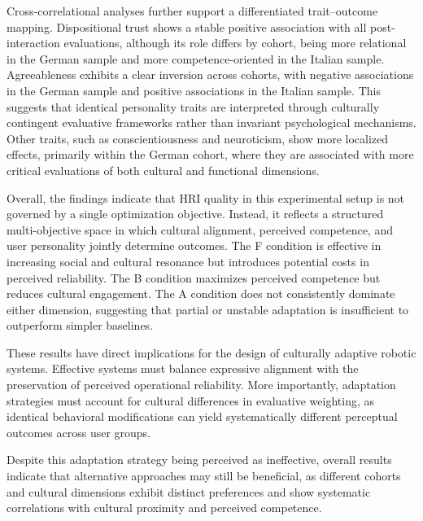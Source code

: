 Cross-correlational analyses further support a differentiated trait–outcome mapping. Dispositional trust shows a stable positive association with all post-interaction evaluations, although its role differs by cohort, being more relational in the German sample and more competence-oriented in the Italian sample. Agreeableness exhibits a clear inversion across cohorts, with negative associations in the German sample and positive associations in the Italian sample. This suggests that identical personality traits are interpreted through culturally contingent evaluative frameworks rather than invariant psychological mechanisms. Other traits, such as conscientiousness and neuroticism, show more localized effects, primarily within the German cohort, where they are associated with more critical evaluations of both cultural and functional dimensions.

Overall, the findings indicate that HRI quality in this experimental setup is not governed by a single optimization objective. Instead, it reflects a structured multi-objective space in which cultural alignment, perceived competence, and user personality jointly determine outcomes. The F condition is effective in increasing social and cultural resonance but introduces potential costs in perceived reliability. The B condition maximizes perceived competence but reduces cultural engagement. The A condition does not consistently dominate either dimension, suggesting that partial or unstable adaptation is insufficient to outperform simpler baselines.

These results have direct implications for the design of culturally adaptive robotic systems. Effective systems must balance expressive alignment with the preservation of perceived operational reliability. More importantly, adaptation strategies must account for cultural differences in evaluative weighting, as identical behavioral modifications can yield systematically different perceptual outcomes across user groups.

Despite this adaptation strategy being perceived as ineffective, overall results indicate that alternative approaches may still be beneficial, as different cohorts and cultural dimensions exhibit distinct preferences and show systematic correlations with cultural proximity and perceived competence.